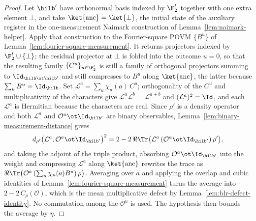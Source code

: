 \begin{proof}
	\leanok
	Let $\hilb'$ have orthonormal basis indexed by $\F_2^t$ together with one
	extra element $\bot$, and take $\ket{\mathrm{anc}} = \ket{\bot}$, the
	initial state of the auxiliary register in the one-measurement Naimark
	construction of Lemma~\ref{lem:naimark-helper}. Apply that construction to
	the Fourier-square POVM $\{B^u\}$ of
	Lemma~\ref{lem:fourier-square-measurement}. It returns
	projectors indexed by $\F_2^t \cup \{\bot\}$; the residual projector at
	$\bot$ is folded into the outcome $u = 0$, so that the resulting family
	$\{C^u\}_{u \in \F_2^t}$ is still a family of orthogonal projectors summing
	to $\Id_{\hilb \ot \hilb'}$ and still compresses to $B^u$ along
	$\ket{\mathrm{anc}}$, the latter because $\sum_u B^u = \Id_{\hilb}$. Set
	$\mathcal{L}^a = \sum_u \chi_u(a) \, C^u$; orthogonality of the $C^u$ and
	multiplicativity of the characters give
	$\mathcal{L}^a \mathcal{L}^b = \mathcal{L}^{a+b}$ and
	$(\mathcal{L}^a)^2 = \Id$, and each $\mathcal{L}^a$ is Hermitian because
	the characters are real. Since $\rho'$ is a density operator and both
	$\mathcal{L}^a$ and $\mathcal{O}^a \ot \Id_{\hilb'}$ are binary
	observables, Lemma~\ref{lem:binary-measurement-distance} gives
	\[
		d_{\rho'}\big(\mathcal{L}^a, \mathcal{O}^a \ot \Id_{\hilb'}\big)^2
		= 2 - 2 \, \Re \Tr\big(\mathcal{L}^a \,
		(\mathcal{O}^a \ot \Id_{\hilb'}) \, \rho'\big) ,
	\]
	and taking the adjoint of the triple product, absorbing
	$\mathcal{O}^a \ot \Id_{\hilb'}$ into the weight and compressing
	$\mathcal{L}^a$ along $\ket{\mathrm{anc}}$ rewrites the trace as
	$\Re \Tr\big(\mathcal{O}^a \, (\sum_u \chi_u(a) B^u) \, \rho\big)$.
	Averaging over $a$ and applying the overlap and cubic identities of
	Lemma~\ref{lem:fourier-square-measurement} turns the average into
	$2 - 2 \, C_\rho(\mathcal{O})$, which is the mean multiplicative defect by
	Lemma~\ref{lem:blr-defect-identity}. No commutation among the
	$\mathcal{O}^u$ is used. The hypothesis then bounds the average by $\eta$.
\end{proof}

